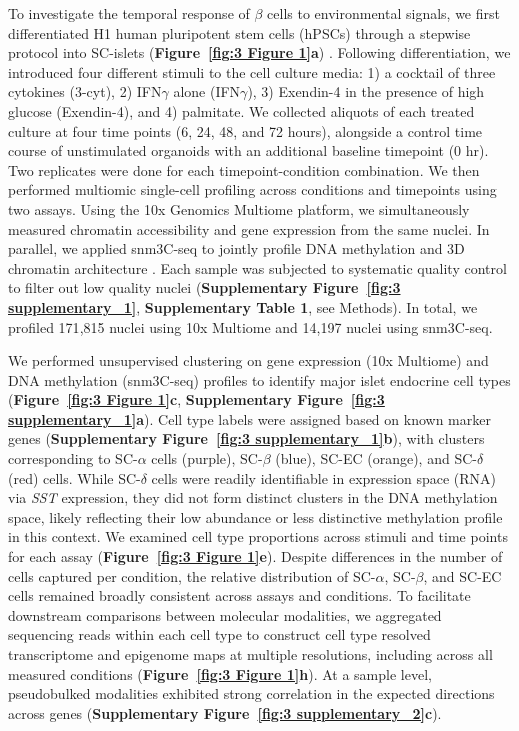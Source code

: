 To investigate the temporal response of $\beta$ cells to environmental signals, we first differentiated H1 human pluripotent stem cells (hPSCs) through a stepwise protocol into SC-islets (\textbf{Figure~\ref{fig:3 Figure 1}\textbf{a}}) \cite{Hogrebe2020-rr,Rezania2014-nz,Veres2019-qb,Velazco-Cruz2019-yq,Zhu2023-qm}. Following differentiation, we introduced four different stimuli to the cell culture media: 1) a cocktail of three cytokines (3-cyt), 2) IFN$\gamma$ alone (IFN$\gamma$), 3) Exendin-4 in the presence of high glucose (Exendin-4), and 4) palmitate. We collected aliquots of each treated culture at four time points (6, 24, 48, and 72 hours), alongside a control time course of unstimulated organoids with an additional baseline timepoint (0 hr). Two replicates were done for each timepoint-condition combination. We then performed multiomic single-cell profiling across conditions and timepoints using two assays. Using the 10x Genomics Multiome platform, we simultaneously measured chromatin accessibility and gene expression from the same nuclei. In parallel, we applied snm3C-seq to jointly profile DNA methylation and 3D chromatin architecture \cite{Liu2021-km}. Each sample was subjected to systematic quality control to filter out low quality nuclei (\textbf{Supplementary Figure~\ref{fig:3 supplementary_1}}, \textbf{Supplementary Table 1}, see Methods). In total, we profiled 171{,}815 nuclei using 10x Multiome and 14{,}197 nuclei using snm3C-seq.

We performed unsupervised clustering on gene expression (10x Multiome) and DNA methylation (snm3C-seq) profiles to identify major islet endocrine cell types (\textbf{Figure~\ref{fig:3 Figure 1}\textbf{c}}, \textbf{Supplementary Figure~\ref{fig:3 supplementary_1}\textbf{a}}). Cell type labels were assigned based on known marker genes (\textbf{Supplementary Figure~\ref{fig:3 supplementary_1}\textbf{b}}), with clusters corresponding to SC-$\alpha$ cells (purple), SC-$\beta$ (blue), SC-EC (orange), and SC-$\delta$ (red) cells. While SC-$\delta$ cells were readily identifiable in expression space (RNA) via \textit{SST} expression, they did not form distinct clusters in the DNA methylation space, likely reflecting their low abundance or less distinctive methylation profile in this context. We examined cell type proportions across stimuli and time points for each assay (\textbf{Figure~\ref{fig:3 Figure 1}\textbf{e}}). Despite differences in the number of cells captured per condition, the relative distribution of SC-$\alpha$, SC-$\beta$, and SC-EC cells remained broadly consistent across assays and conditions. To facilitate downstream comparisons between molecular modalities, we aggregated sequencing reads within each cell type to construct cell type resolved transcriptome and epigenome maps at multiple resolutions, including across all measured conditions (\textbf{Figure~\ref{fig:3 Figure 1}\textbf{h}}). At a sample level, pseudobulked modalities exhibited strong correlation in the expected directions across genes (\textbf{Supplementary Figure~\ref{fig:3 supplementary_2}\textbf{c}}).

